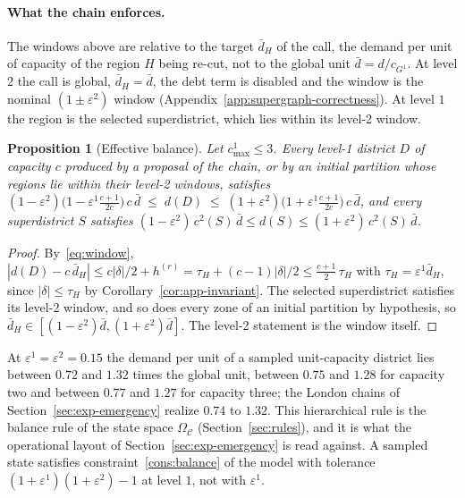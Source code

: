 \documentclass[preprint,12pt,authoryear]{elsarticle}
\newtheorem{proposition}[theorem]{Proposition}
\theoremstyle{definition}
\begin{document}
\paragraph{What the chain enforces.}
The windows above are relative to the target $\bar d_H$ of the call, the demand per unit of capacity of the region $H$ being re-cut, not to the global unit $\bar d = d/c_{G^1}$. At level $2$ the call is global, $\bar d_H = \bar d$, the debt term is disabled and the window is the nominal $(1\pm\varepsilon^2)$ window (Appendix~\ref{app:supergraph-correctness}). At level $1$ the region is the selected superdistrict, which lies within its level-2 window.
\begin{proposition}[Effective balance]\label{prop:effective}
Let $c^1_{\max}\le 3$. Every level-1 district $D$ of capacity $c$ produced by a proposal of the chain, or by an initial partition whose regions lie within their level-2 windows, satisfies
$(1-\varepsilon^2)\bigl(1-\varepsilon^1\tfrac{c+1}{2c}\bigr)\,c\,\bar d \;\le\; d(D) \;\le\; (1+\varepsilon^2)\bigl(1+\varepsilon^1\tfrac{c+1}{2c}\bigr)\,c\,\bar d$,
and every superdistrict $S$ satisfies $(1-\varepsilon^2)\,c^2(S)\,\bar d \le d(S) \le (1+\varepsilon^2)\,c^2(S)\,\bar d$.
\end{proposition}
\begin{proof}
By~\eqref{eq:window}, $|d(D)-c\,\bar d_H| \le c|\delta|/2 + h^{(r)} = \tau_H + (c-1)|\delta|/2 \le \tfrac{c+1}{2}\,\tau_H$ with $\tau_H = \varepsilon^1 \bar d_H$, since $|\delta|\le\tau_H$ by Corollary~\ref{cor:app-invariant}. The selected superdistrict satisfies its level-2 window, and so does every zone of an initial partition by hypothesis, so $\bar d_H \in [(1-\varepsilon^2)\bar d,(1+\varepsilon^2)\bar d]$. The level-2 statement is the window itself.
\end{proof}
At $\varepsilon^1 = \varepsilon^2 = 0.15$ the demand per unit of a sampled unit-capacity district lies between $0.72$ and $1.32$ times the global unit, between $0.75$ and $1.28$ for capacity two and between $0.77$ and $1.27$ for capacity three; the London chains of Section~\ref{sec:exp-emergency} realize $0.74$ to $1.32$. This hierarchical rule is the balance rule of the state space $\Omega_{\mathcal C}$ (Section~\ref{sec:rules}), and it is what the operational layout of Section~\ref{sec:exp-emergency} is read against. A sampled state satisfies constraint~\eqref{cons:balance} of the model with tolerance $(1+\varepsilon^1)(1+\varepsilon^2)-1$ at level $1$, not with $\varepsilon^1$.
\end{document}
